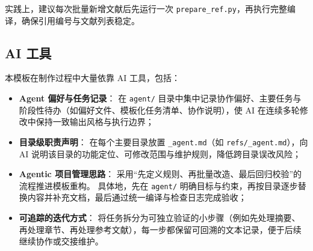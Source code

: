 实践上，建议每次批量新增文献后先运行一次 \texttt{prepare\_ref.py}，再执行完整编译，确保引用编号与文献列表稳定。

\subsection{AI 工具}

本模板在制作过程中大量依靠 AI 工具，包括：
\begin{itemize}
  \item \textbf{Agent 偏好与任务记录}：
  在 \texttt{agent/} 目录中集中记录协作偏好、主要任务与阶段性待办（如偏好文件、模板化任务清单、协作说明），使 AI 在连续多轮修改中保持一致输出风格与执行边界；
  \item \textbf{目录级职责声明}：
  在每个主要目录放置 \texttt{\_agent.md}（如 \texttt{refs/\_agent.md}），向 AI 说明该目录的功能定位、可修改范围与维护规则，降低跨目录误改风险；
  \item \textbf{Agentic 项目管理思路}：
  采用“先定义规则、再批量改造、最后回归校验”的流程推进模板重构。
  具体地，先在 \texttt{agent/} 明确目标与约束，再按目录逐步替换内容并补充文档，最后通过统一编译与检查日志完成验收；
  \item \textbf{可追踪的迭代方式}：
  将任务拆分为可独立验证的小步骤（例如先处理摘要、再处理章节、再处理参考文献），每一步都保留可回溯的文本记录，便于后续继续协作或交接维护。
\end{itemize}
